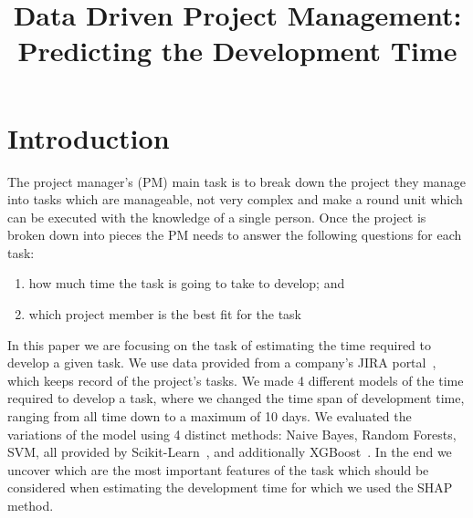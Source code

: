 \documentclass[conference]{IEEEtran}
\begin{document}
\title{Data Driven Project Management: \\ Predicting the Development Time}


\author{
}

\maketitle

\begin{abstract}

\end{abstract}

\IEEEpeerreviewmaketitle

\section{Introduction}

The project manager's (PM) main task is to break down the project they manage into tasks which are manageable, not very complex and make a round unit which can be executed with the knowledge of a single person.
Once the project is broken down into pieces the PM needs to answer the following questions for each task:
\begin{enumerate}
	\item how much time the task is going to take to develop; and
	\item which project member is the best fit for the task
\end{enumerate}
In this paper we are focusing on the task of estimating the time required to develop a given task. We use data provided from a company's JIRA portal~\cite{JIRA}, which keeps record of the project's tasks. We made 4 different models of the time required to develop a task, where we changed the time span of development time, ranging from all time down to a maximum of 10 days. We evaluated the variations of the model using 4 distinct methods: Naive Bayes, Random Forests, SVM, all provided by Scikit-Learn~\cite{scikit-learn}, and additionally XGBoost~\cite{chen2016xgboost}. In the end we uncover which are the most important features of the task which should be considered when estimating the development time for which we used the SHAP~\cite{lundberg2020local2global} method.
\end{document}
